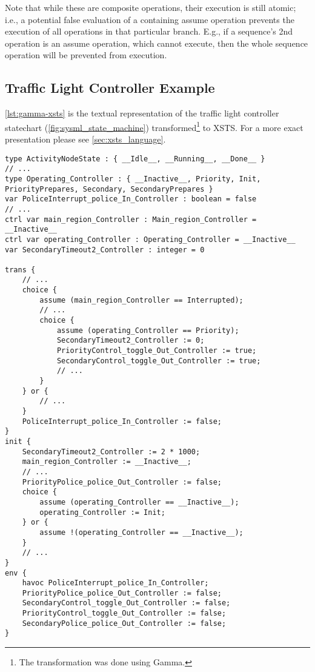 Note that while these are composite operations, their execution is still atomic; i.e., a potential false evaluation of a containing assume operation prevents the execution of all operations in that particular branch. E.g., if a sequence's 2nd operation is an assume operation, which cannot execute, then the whole sequence operation will be prevented from execution.

\subsection{Traffic Light Controller Example}

\autoref{lst:gamma-xsts} is the textual representation of the traffic light controller statechart (\autoref{fig:sysml_state_machine}) transformed\footnote{The transformation was done using Gamma.} to XSTS. For a more exact presentation please see \autoref{sec:xsts_language}.

\begin{lstlisting}[float,language=xsts, caption={Gamma XSTS Language representing the traffic light controller statechart.}, label={lst:gamma-xsts}]
type ActivityNodeState : { __Idle__, __Running__, __Done__ }
// ...
type Operating_Controller : { __Inactive__, Priority, Init, PriorityPrepares, Secondary, SecondaryPrepares }
var PoliceInterrupt_police_In_Controller : boolean = false
// ...
ctrl var main_region_Controller : Main_region_Controller = __Inactive__
ctrl var operating_Controller : Operating_Controller = __Inactive__
var SecondaryTimeout2_Controller : integer = 0

trans {
	// ...
	choice {
		assume (main_region_Controller == Interrupted); 
		// ...
		choice {
			assume (operating_Controller == Priority);
			SecondaryTimeout2_Controller := 0;
			PriorityControl_toggle_Out_Controller := true;
			SecondaryControl_toggle_Out_Controller := true;
			// ...
		}
	} or {
		// ...
	}
	PoliceInterrupt_police_In_Controller := false;
}
init {
	SecondaryTimeout2_Controller := 2 * 1000;
	main_region_Controller := __Inactive__;
	// ...
	PriorityPolice_police_Out_Controller := false;
	choice {
		assume (operating_Controller == __Inactive__);
		operating_Controller := Init;
	} or {
		assume !(operating_Controller == __Inactive__);
	}
	// ...
}
env {
	havoc PoliceInterrupt_police_In_Controller;
	PriorityPolice_police_Out_Controller := false;
	SecondaryControl_toggle_Out_Controller := false;
	PriorityControl_toggle_Out_Controller := false;
	SecondaryPolice_police_Out_Controller := false;
}
\end{lstlisting}
